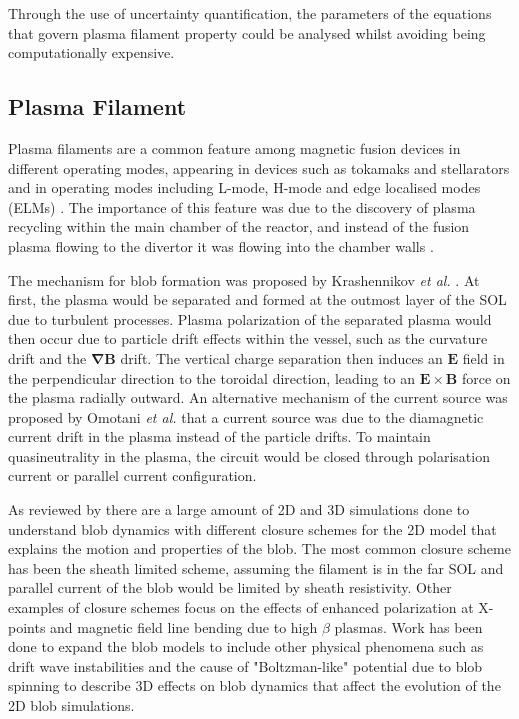 \documentclass{article}
\begin{document}
Through the use of uncertainty quantification, the parameters of the equations that govern plasma filament property could be analysed whilst avoiding being computationally expensive. 

\subsection*{Plasma Filament}
Plasma filaments are a common feature among magnetic fusion devices in different operating modes, appearing in devices such as tokamaks and stellarators and in operating modes including L-mode, H-mode and edge localised modes (ELMs) \cite{ben_ayed_inter-elm_2009, killer_plasma_2020, boedo_transport_2003}. The importance of this feature was due to the discovery of plasma recycling within the main chamber of the reactor, and instead of the fusion plasma flowing to the divertor it was flowing into the chamber walls \cite{krasheninnikov_recent_2008,dippolito_convective_2011}.

The mechanism for blob formation was proposed by Krashennikov \textit{et al.} \cite{krasheninnikov_recent_2008, krasheninnikov_scrape_2001}. At first, the plasma would be separated and formed at the outmost layer of the SOL due to turbulent processes. Plasma polarization of the separated plasma would then occur due to particle drift effects within the vessel, such as the curvature drift and the $\bm{\nabla B}$ drift. The vertical charge separation then induces an $\bm{E}$ field in the perpendicular direction to the toroidal direction, leading to an $\bm{E}\times\bm{B}$ force on the plasma radially outward. An alternative mechanism of the current source was proposed by Omotani \textit{et al.} that a current source was due to the diamagnetic current drift in the plasma instead of the particle drifts. To maintain quasineutrality in the plasma, the circuit would be closed through polarisation current or parallel current configuration.

As reviewed by \cite{dippolito_convective_2011} there are a large amount of  2D and 3D simulations done to understand blob dynamics with different closure schemes for the 2D model that explains the motion and properties of the blob. The most common closure scheme has been the  sheath limited scheme, assuming the filament is in the far SOL and parallel current of the blob would be limited by sheath resistivity. Other examples of closure schemes focus on the effects of enhanced polarization at X-points and magnetic field line bending due to high $\beta$ plasmas\cite{krasheninnikov_recent_2008}. Work has been done to expand the blob models to include other physical phenomena such as drift wave instabilities \cite{angus_effect_2012} and the cause of "Boltzman-like" potential due to blob spinning \cite{angus_effects_2012} to describe 3D effects on blob dynamics that affect the evolution of the 2D blob simulations.
\end{document}

